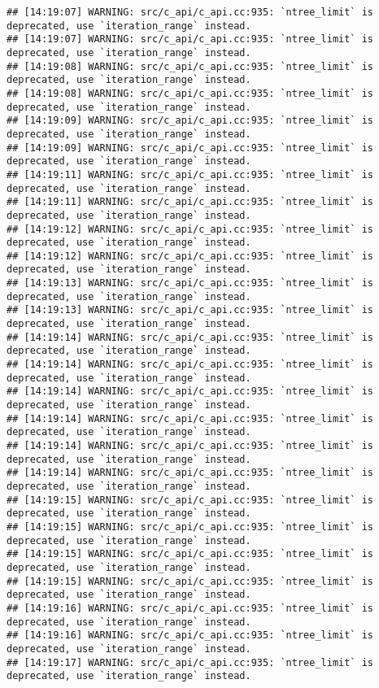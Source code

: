 \documentclass[
]{article}
\begin{document}
\begin{verbatim}
## [14:19:07] WARNING: src/c_api/c_api.cc:935: `ntree_limit` is deprecated, use `iteration_range` instead.
## [14:19:07] WARNING: src/c_api/c_api.cc:935: `ntree_limit` is deprecated, use `iteration_range` instead.
## [14:19:08] WARNING: src/c_api/c_api.cc:935: `ntree_limit` is deprecated, use `iteration_range` instead.
## [14:19:08] WARNING: src/c_api/c_api.cc:935: `ntree_limit` is deprecated, use `iteration_range` instead.
## [14:19:09] WARNING: src/c_api/c_api.cc:935: `ntree_limit` is deprecated, use `iteration_range` instead.
## [14:19:09] WARNING: src/c_api/c_api.cc:935: `ntree_limit` is deprecated, use `iteration_range` instead.
## [14:19:11] WARNING: src/c_api/c_api.cc:935: `ntree_limit` is deprecated, use `iteration_range` instead.
## [14:19:11] WARNING: src/c_api/c_api.cc:935: `ntree_limit` is deprecated, use `iteration_range` instead.
## [14:19:12] WARNING: src/c_api/c_api.cc:935: `ntree_limit` is deprecated, use `iteration_range` instead.
## [14:19:12] WARNING: src/c_api/c_api.cc:935: `ntree_limit` is deprecated, use `iteration_range` instead.
## [14:19:13] WARNING: src/c_api/c_api.cc:935: `ntree_limit` is deprecated, use `iteration_range` instead.
## [14:19:13] WARNING: src/c_api/c_api.cc:935: `ntree_limit` is deprecated, use `iteration_range` instead.
## [14:19:14] WARNING: src/c_api/c_api.cc:935: `ntree_limit` is deprecated, use `iteration_range` instead.
## [14:19:14] WARNING: src/c_api/c_api.cc:935: `ntree_limit` is deprecated, use `iteration_range` instead.
## [14:19:14] WARNING: src/c_api/c_api.cc:935: `ntree_limit` is deprecated, use `iteration_range` instead.
## [14:19:14] WARNING: src/c_api/c_api.cc:935: `ntree_limit` is deprecated, use `iteration_range` instead.
## [14:19:14] WARNING: src/c_api/c_api.cc:935: `ntree_limit` is deprecated, use `iteration_range` instead.
## [14:19:14] WARNING: src/c_api/c_api.cc:935: `ntree_limit` is deprecated, use `iteration_range` instead.
## [14:19:15] WARNING: src/c_api/c_api.cc:935: `ntree_limit` is deprecated, use `iteration_range` instead.
## [14:19:15] WARNING: src/c_api/c_api.cc:935: `ntree_limit` is deprecated, use `iteration_range` instead.
## [14:19:15] WARNING: src/c_api/c_api.cc:935: `ntree_limit` is deprecated, use `iteration_range` instead.
## [14:19:15] WARNING: src/c_api/c_api.cc:935: `ntree_limit` is deprecated, use `iteration_range` instead.
## [14:19:16] WARNING: src/c_api/c_api.cc:935: `ntree_limit` is deprecated, use `iteration_range` instead.
## [14:19:16] WARNING: src/c_api/c_api.cc:935: `ntree_limit` is deprecated, use `iteration_range` instead.
## [14:19:17] WARNING: src/c_api/c_api.cc:935: `ntree_limit` is deprecated, use `iteration_range` instead.

\end{verbatim}
\end{document}
